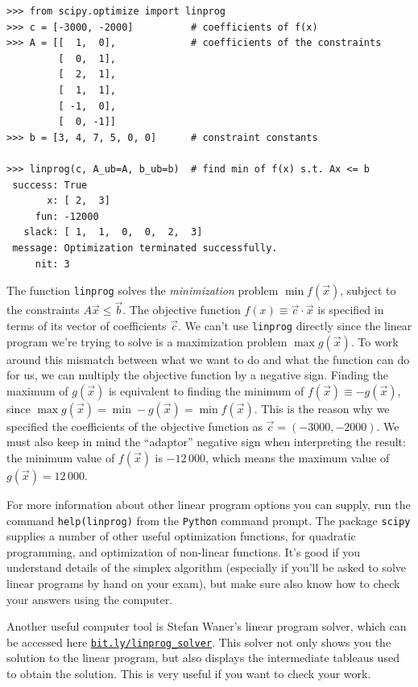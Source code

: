 \documentclass[11pt,oneside]{article}
\begin{document}
\begin{verbatim}
>>> from scipy.optimize import linprog
>>> c = [-3000, -2000]          # coefficients of f(x) 
>>> A = [[  1,  0],             # coefficients of the constraints
         [  0,  1],
         [  2,  1],
         [  1,  1],
         [ -1,  0],
         [  0, -1]]
>>> b = [3, 4, 7, 5, 0, 0]      # constraint constants 

>>> linprog(c, A_ub=A, b_ub=b)  # find min of f(x) s.t. Ax <= b
 success: True
       x: [ 2,  3] 
     fun: -12000
   slack: [ 1,  1,  0,  0,  2,  3]
 message: Optimization terminated successfully.
     nit: 3
\end{verbatim}

		\noindent
		The function \texttt{linprog} solves the \emph{minimization} problem $\min f(\vec{x})$,
		subject to the constraints $A\vec{x} \leq \vec{b}$.
		The objective function $f(x)\equiv \vec{c} \cdot \vec{x}$ is specified in terms of its 
		vector of coefficients $\vec{c}$.
		We can't use \texttt{linprog} directly since the linear program we're trying to solve is a 
		maximization problem $\max g(\vec{x})$.
		To work around this mismatch between what we want to do and what the function can do for us,
		we can multiply the objective function by a negative sign.
		Finding the maximum of $g(\vec{x})$ is equivalent to finding the minimum of $f(\vec{x}) \equiv -g(\vec{x})$,
		since $\max g(\vec{x}) = \min -g(\vec{x}) = \min f(\vec{x})$.
		This is the reason why we specified the coefficients of the objective function as $\vec{c} = (-3000, -2000)$.
		We must also keep in mind the ``adaptor'' negative sign when interpreting the result:
		the minimum value of $f(\vec{x})$ is $-12\,000$, which means the maximum value of $g(\vec{x})=12\,000$.
		
		For more information about other linear program options you can supply,
		run the command \texttt{help(linprog)} from the \texttt{Python} command prompt.
		The package \texttt{scipy} supplies a number of other useful optimization functions,
		for quadratic programming, and optimization of non-linear functions.
		It's good if you understand details of the simplex algorithm
		(especially if you'll be asked to solve linear programs by hand on your exam),
		but make sure also know how to check your answers using the computer.
		
		Another useful computer tool is Stefan Waner's linear program solver,
		which can be accessed here \href{http://bit.ly/linprog_solver}{\texttt{bit.ly/linprog\_solver}}.
		This solver not only shows you the solution to the linear program,
		but also displays the intermediate tableaus used to obtain the solution.
		This is very useful if you want to check your work.
		
\end{document}
